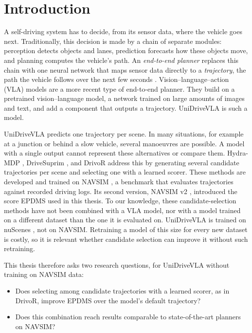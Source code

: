 \documentclass[11pt, a4paper, oneside]{book}
\begin{document}
\tableofcontents
\listoffigures
\listoftables

\mainmatter

\chapter{Introduction}

A self-driving system has to decide, from its sensor data, where the vehicle goes next.
Traditionally, this decision is made by a chain of separate modules: perception detects
objects and lanes, prediction forecasts how these objects move, and planning computes the
vehicle's path. An \emph{end-to-end planner} replaces this chain with one neural network that
maps sensor data directly to a \emph{trajectory}, the path the vehicle follows over the next
few seconds \cite{uniad}. Vision--language--action (VLA) models are a more recent type of end-to-end
planner. They build on a pretrained vision--language model, a network trained on large amounts
of images and text, and add a component that outputs a trajectory. UniDriveVLA
\cite{unidrivevla} is such a model.

UniDriveVLA predicts one trajectory per scene. In many situations, for example at a junction
or behind a slow vehicle, several manoeuvres are possible. A model with a single output cannot
represent these alternatives or compare them. Hydra-MDP \cite{hydramdp}, DriveSuprim
\cite{drivesuprim}, and DrivoR \cite{drivor} address this by generating several candidate
trajectories per scene and selecting one with a learned scorer. These methods are developed
and trained on NAVSIM \cite{navsim}, a benchmark that evaluates trajectories against recorded
driving logs. Its second version, NAVSIM v2 \cite{pseudosim}, introduced the score EPDMS used in
this thesis. To our knowledge, these candidate-selection methods have not been combined with
a VLA model, nor with a model trained on a different dataset than the one it is evaluated on.
UniDriveVLA is trained on nuScenes \cite{nuscenes}, not on NAVSIM. Retraining a model of this
size for every new dataset is costly, so it is relevant whether candidate selection can
improve it without such retraining.

This thesis therefore asks two research questions, for UniDriveVLA without training on
NAVSIM data:
\begin{itemize}
  \item Does selecting among candidate trajectories with a learned scorer, as in DrivoR,
  improve EPDMS over the model's default trajectory?
  \item Does this combination reach results comparable to state-of-the-art planners on
  NAVSIM?
\end{itemize}
\end{document}
